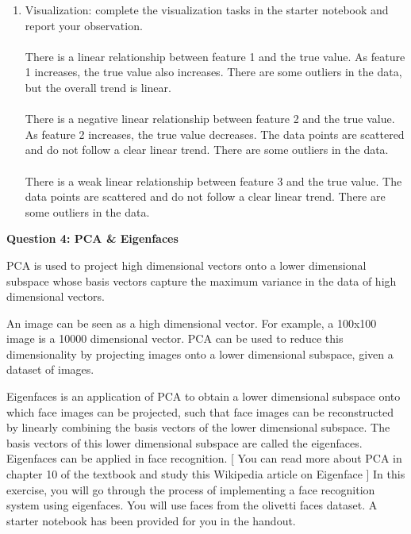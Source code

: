 \documentclass[12pt]{extarticle} %
\begin{document}
\begin{enumerate}
    \item Visualization: complete the visualization tasks in the starter notebook and report your observation.
    \\\\ There is a linear relationship between feature 1 and the true value. As feature 1 increases, the true value also increases. There are some outliers in the data, but the overall trend is linear. 
    \\\\ There is a negative linear relationship between feature 2 and the true value. As feature 2 increases, the true value decreases. The data points are scattered and do not follow a clear linear trend. There are some outliers in the data.
    \\\\ There is a weak linear relationship between feature 3 and the true value. The data points are scattered and do not follow a clear linear trend. There are some outliers in the data.
\end{enumerate}
\newpage
\begin{center}
    \large \textbf{Question 4: PCA \& Eigenfaces}
\end{center}
PCA is used to project high dimensional vectors onto a lower dimensional subspace whose basis vectors
capture the maximum variance in the data of high dimensional vectors.

An image can be seen as a high dimensional vector. For example, a 100x100 image is a 10000 dimensional
vector. PCA can be used to reduce this dimensionality by projecting images onto a lower dimensional
subspace, given a dataset of images.

Eigenfaces is an application of PCA to obtain a lower dimensional subspace onto which face images can
be projected, such that face images can be reconstructed by linearly combining the basis vectors of the
lower dimensional subspace. The basis vectors of this lower dimensional subspace are called the eigenfaces.
Eigenfaces can be applied in face recognition.
[
You can read more about PCA in chapter 10 of the textbook and study this Wikipedia article on Eigenface
]
In this exercise, you will go through the process of implementing a face recognition system using eigenfaces.
You will use faces from the olivetti faces dataset. A starter notebook has been provided for you in the
handout.
\end{document}
